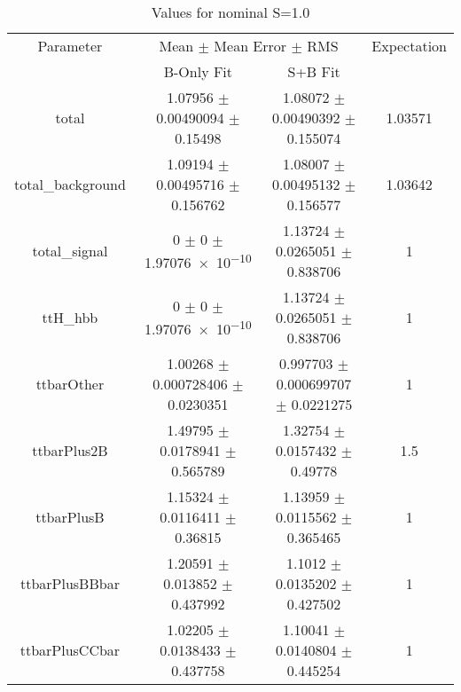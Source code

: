 \begin{table}
\centering
\caption{Values for nominal S=1.0}
\begin{tabular}{cccc}
\toprule
Parameter & \multicolumn{2}{c}{Mean $\pm$ Mean Error $\pm$ RMS} & Expectation\\
 & B-Only Fit & S+B Fit & \\
\midrule
total & \num{1.07956} $\pm$ \num{0.00490094} $\pm$ \num{0.15498} & \num{1.08072} $\pm$ \num{0.00490392} $\pm$ \num{0.155074} & \num{1.03571}\\
total\_background & \num{1.09194} $\pm$ \num{0.00495716} $\pm$ \num{0.156762} & \num{1.08007} $\pm$ \num{0.00495132} $\pm$ \num{0.156577} & \num{1.03642}\\
total\_signal & \num{0} $\pm$ \num{0} $\pm$ \num{1.97076e-10} & \num{1.13724} $\pm$ \num{0.0265051} $\pm$ \num{0.838706} & \num{1}\\
ttH\_hbb & \num{0} $\pm$ \num{0} $\pm$ \num{1.97076e-10} & \num{1.13724} $\pm$ \num{0.0265051} $\pm$ \num{0.838706} & \num{1}\\
ttbarOther & \num{1.00268} $\pm$ \num{0.000728406} $\pm$ \num{0.0230351} & \num{0.997703} $\pm$ \num{0.000699707} $\pm$ \num{0.0221275} & \num{1}\\
ttbarPlus2B & \num{1.49795} $\pm$ \num{0.0178941} $\pm$ \num{0.565789} & \num{1.32754} $\pm$ \num{0.0157432} $\pm$ \num{0.49778} & \num{1.5}\\
ttbarPlusB & \num{1.15324} $\pm$ \num{0.0116411} $\pm$ \num{0.36815} & \num{1.13959} $\pm$ \num{0.0115562} $\pm$ \num{0.365465} & \num{1}\\
ttbarPlusBBbar & \num{1.20591} $\pm$ \num{0.013852} $\pm$ \num{0.437992} & \num{1.1012} $\pm$ \num{0.0135202} $\pm$ \num{0.427502} & \num{1}\\
ttbarPlusCCbar & \num{1.02205} $\pm$ \num{0.0138433} $\pm$ \num{0.437758} & \num{1.10041} $\pm$ \num{0.0140804} $\pm$ \num{0.445254} & \num{1}\\
\bottomrule
\end{tabular}
\end{table}